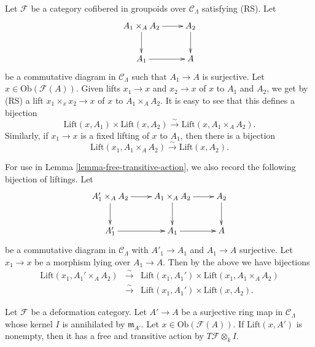 \begin{remark}
\label{remark-lift-bijections}
Let $\mathcal{F}$ be a category cofibered in groupoids over $\mathcal 
C_\Lambda$ satisfying (RS).  Let
\[
\xymatrix{ 
A_1 \times_{A} A_2 \ar[r] \ar[d] & A_2 \ar[d] \\
A_1 \ar[r] & A
}
\]
be a commutative diagram in $\mathcal{C}_\Lambda$ such that $A_1 \to 
A$ is surjective.  Let $x \in \text{Ob}(\mathcal{F}(A))$. Given lifts $x_1 
\to x$ and $x_2 \to x$ of $x$ to $A_1$ and $A_2$, we get by 
(RS) a lift $x_1 \times_{x} x_2 \to x$ of $x$ to $A_1 \times_{A} A_2$. 
It is easy to see that this defines a bijection
\[ \text{Lift}(x,A_1) \times \text{Lift}(x,A_2) \xrightarrow{\sim} 
\text{Lift}(x, A_1 \times_{A} A_2) .\]
Similarly, if $x_1 \to x$ is a fixed lifting of $x$ to $A_1$, then 
there is a bijection
\[ \text{Lift}(x_1, A_1 \times_{A} A_2) \xrightarrow{\sim} 
\text{Lift}(x, A_2) .\]

\medskip \noindent 
For use in Lemma \ref{lemma-free-transitive-action}, we also record the 
following bijection of liftings.  Let
\[
\xymatrix{
A_1' \times_{A} A_2 \ar[r] \ar[d] & A_1 \times_{A} A_2 \ar[r] \ar[d] & A_2 
\ar[d] \\
A_1' \ar[r] & A_1 \ar[r] & A
}
\]
be a commutative diagram in $\mathcal{C}_\Lambda$ with $A'_1 \to A_1$ 
and $A_1 \to A$ surjective.  Let $x_1 \to x$ be a morphism 
lying over $A_1 \to A$.  Then by the above we have bijections
\begin{eqnarray*}
\text{Lift}(x_1,A_1' \times_{A} A_2) & \xrightarrow{\sim} & 
\text{Lift}(x_1,A_1') \times \text{Lift}(x_1, A_1 \times_{A} A_2) 
\\ 
& \xrightarrow{\sim} & \text{Lift}(x_1,A_1') \times \text{Lift}(x, 
A_2).
\end{eqnarray*}
\end{remark}

\begin{lemma}
\label{lemma-free-transitive-action}
Let $\mathcal{F}$ be a deformation category.  Let $A' \to A$ be a 
surjective ring map in $\mathcal{C}_\Lambda$ whose kernel $I$ is annihilated 
by $\mathfrak{m}_{A'}$.  Let $x \in \text{Ob}(\mathcal{F}(A))$.  If 
$\text{Lift}(x,A')$ is nonempty, then it has a free and transitive action 
by $T\mathcal{F} \otimes_{k} I$. 
\end{lemma}

